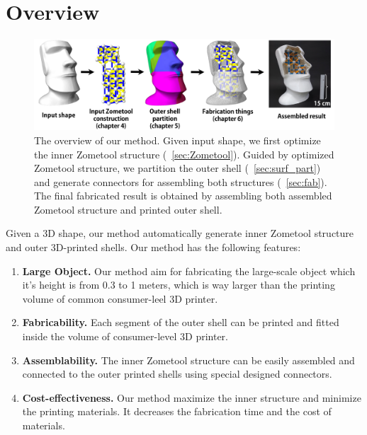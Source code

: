 \section{Overview}
\label{sec:overview}

\begin{figure}[h]
\centering
\includegraphics[width=1.0\linewidth]{figs/pipeline2.pdf} 
\caption{
The overview of our method. 
Given input shape, we first optimize the inner Zometool structure (\secname~\ref{sec:Zometool}). Guided by optimized Zometool structure, we partition the outer shell (\secname~\ref{sec:surf_part}) and generate connectors for assembling both structures (\secname~\ref{sec:fab}).
The final fabricated result is obtained by assembling both assembled Zometool structure and printed outer shell.
}
\label{fig:result-pipeline}
\end{figure}

Given a 3D shape, our method automatically generate inner Zometool structure and outer 3D-printed shells.
Our method has the following features:
\begin{enumerate}
\item \textbf{Large Object.} Our method aim for fabricating the large-scale object which it's height is from 0.3 to 1 meters, which is way larger than the printing volume of common consumer-leel 3{D} printer.
\item \textbf{Fabricability.} Each segment of the outer shell can be printed and fitted inside the volume of consumer-level 3{D} printer.
\item \textbf{Assemblability.} The inner Zometool structure can be easily assembled and connected to the outer printed shells using special designed connectors.
\item \textbf{Cost-effectiveness.} Our method maximize the inner structure and minimize the printing materials. 
It decreases the fabrication time and the cost of materials.
\end{enumerate}

